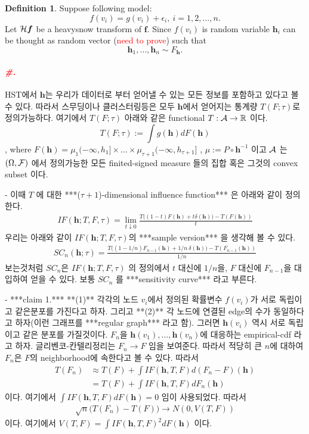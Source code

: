 \documentclass[preprint, review, 12pt]{article}
\theoremstyle{definition}
\newtheorem{dfn}{Definition}
\theoremstyle{remark}
\def\shrp{\paragraph{\textcolor{red}{\textit{\#.}}}}
\begin{document}
\begin{dfn}
Suppose following model:
\[
f(v_i)=g(v_i)+\epsilon_i, ~ i=1,2,\dots,n. 
\]
Let ${\cal H}\boldsymbol{f}$ be a heavysnow transform of ${\boldsymbol f}$. Since $f(v_i)$ is random variable ${\boldsymbol h}_i$ can be thought as random vector (\textcolor{red}{need to prove}) such that 
\[
{\boldsymbol h}_1,\dots,{\boldsymbol h}_n \sim F_{\boldsymbol h}.
\] 
\shrp HST에서 ${\boldsymbol h}$는 우리가 데이터로 부터 얻어낼 수 있는 모든 정보를 포함하고 있다고 볼 수 있다. 따라서 스무딩이나 클러스터링등은 모두 ${\boldsymbol h}$에서 얻어지는 통계량 $T(F;\tau)$로 정의가능하다. 여기에서 $T(F;\tau)$ 아래와 같은 functional $T:{\cal A} \to \mathbb{R}$ 이다. 
\[
T(F;\tau):=\int g({\boldsymbol h}) dF({\boldsymbol h})
\]
, where $F({\boldsymbol h})=\mu_1(-\infty,h_1]\times \dots \times \mu_{\tau+1}(-\infty,h_{\tau+1}]$ , $\mu:=P \circ {\boldsymbol h}^{-1}$ 이고 ${\cal A}$ 는 $(\Omega,{\cal F})$ 에서 정의가능한 모든 finited-signed measure 들의 집합 혹은 그것의 convex subset 이다. 

- 이때 $T$ 에 대한 ***($\tau+1$)-dimensional influence function*** 은 아래와 같이 정의한다. 
\begin{align}
IF({\boldsymbol h}; T,F,\tau)= \lim_{t\downarrow 0}\frac{T\Big((1-t)F(\boldsymbol{h}) + t \delta(\boldsymbol{h}) \Big)-T(F(\boldsymbol{h}))}{t}
\end{align}
우리는 아래와 같이 $IF({\boldsymbol h}; T,F,\tau)$의 ***sample version*** 을 생각해 볼 수 있다. 
\begin{align}
SC_{n}({\boldsymbol h};\tau)= \frac{T\Big((1-1/n)F_{n-1}(\boldsymbol{h}) + 1/n ~ \delta(\boldsymbol{h}) \Big)-T(F_{n-1}(\boldsymbol{h}))}{1/n}
\end{align}
보는것처럼 $SC_{n}$은 $IF({\boldsymbol h}; T,F,\tau)$ 의 정의에서 $t$ 대신에 $1/n$을, $F$ 대신에 $F_{n-1}$을 대입하여 얻을 수 있다. 보통 $SC_{n}$ 를 ***sensitivity curve*** 라고 부른다. 

- ***claim 1.*** **(1)** 각각의 노드 $v_i$에서 정의된 확률변수 $f(v_i)$가 서로 독립이고 같은분포를 가진다고 하자. 그리고 **(2)** 각 노드에 연결된 edge의 수가 동일하다고 하자(이런 그래프를 ***regular graph*** 라고 함). 그러면 $\boldsymbol{h}(v_i)$ 역시 서로 독립이고 같은 분포를 가질것이다. $F_n$을 $\boldsymbol{h}(v_1),\dots,\boldsymbol{\dot h}(v_n)$에 대응하는 empirical-cdf 라고 하자. 글리벤코-칸텔리정리는 $F_n \to F$ 임을 보여준다. 따라서 적당히 큰 $n$에 대하여 $F_n$은 $F$의 neighborhood에 속한다고 볼 수 있다. 따라서 
\begin{align}
T(F_n) & \approx  T(F)+\int IF(\boldsymbol{h},T,F)d(F_n-F)(\boldsymbol{h}) \\
& = T(F)+\int IF(\boldsymbol{h},T,F) dF_n(\boldsymbol{h}) 
\end{align}
이다. 여기에서 $\int IF(\boldsymbol{h},T,F)dF(\boldsymbol{h})=0$ 임이 사용되었다. 따라서 
\begin{align}
\sqrt{n}\Big(T(F_n)-T(F) \Big) \to N(0,V(T,F))
\end{align}
이다. 여기에서 $V(T,F)=\int IF(\boldsymbol{h},T,F)^2 dF(\boldsymbol{h})$ 이다. 


\end{dfn}
\end{document}
